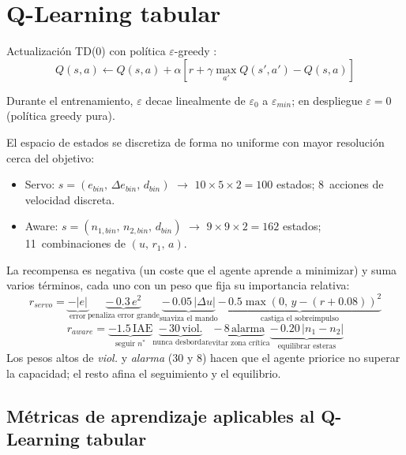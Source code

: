 \section{Q-Learning tabular}

Actualización TD(0) con política $\varepsilon$-greedy \cite[cap.~6]{sutton2018reinforcement}:
\[
Q(s,a) \leftarrow Q(s,a) + \alpha\!\left[r + \gamma\max_{a'}Q(s',a') - Q(s,a)\right]
\]

Durante el entrenamiento, $\varepsilon$ decae linealmente de $\varepsilon_0$ a $\varepsilon_{min}$; en despliegue $\varepsilon=0$ (política greedy pura).

El espacio de estados se discretiza de forma no uniforme con mayor resolución cerca del objetivo:
\begin{itemize}
  \item Servo: $s=(e_{bin},\,\Delta e_{bin},\,d_{bin})$ $\rightarrow$ $10\times5\times2=100$ estados; 8~acciones de velocidad discreta.
  \item Aware: $s=(n_{1,bin},\,n_{2,bin},\,d_{bin})$ $\rightarrow$ $9\times9\times2=162$ estados; 11~combinaciones de $(u,\,r_1,\,a)$.
\end{itemize}

La recompensa es negativa (un coste que el agente aprende a minimizar) y suma varios términos, cada uno con un peso que fija su importancia relativa:
\[
r_{servo} = \underbrace{-|e|}_{\text{error}} \underbrace{-\,0.3\,e^2}_{\text{penaliza error grande}} \underbrace{-\,0.05\,|\Delta u|}_{\text{suaviza el mando}} \underbrace{-\,0.5\max(0,\,y-(r{+}0.08))^2}_{\text{castiga el sobreimpulso}}
\]
\[
r_{aware} = \underbrace{-1.5\,\text{IAE}}_{\text{seguir }n^*} \underbrace{-\,30\,\text{viol.}}_{\text{nunca desbordar}} \underbrace{-\,8\,\text{alarma}}_{\text{evitar zona crítica}} \underbrace{-\,0.20\,|n_1-n_2|}_{\text{equilibrar esteras}}
\]
Los pesos altos de \emph{viol.} y \emph{alarma} (30 y 8) hacen que el agente priorice no superar la capacidad; el resto afina el seguimiento y el equilibrio.




\subsection*{Métricas de aprendizaje aplicables al Q-Learning tabular}

